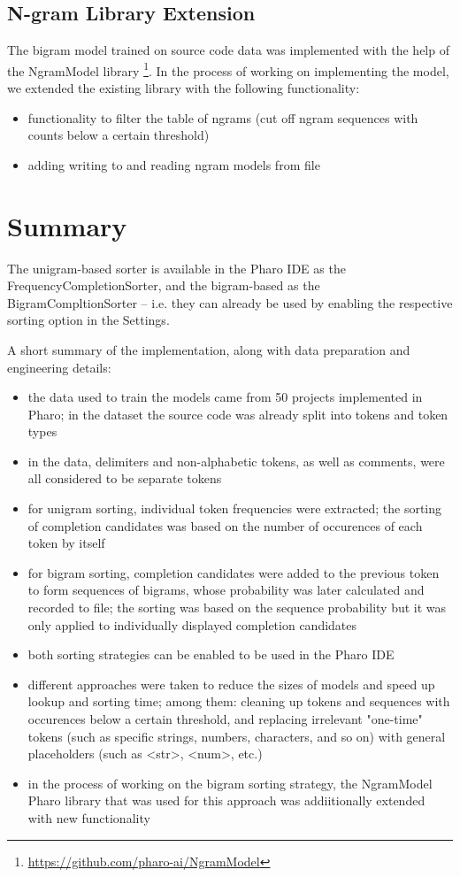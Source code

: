 \subsection{N-gram Library Extension}
The bigram model trained on source code data was implemented with the help of the NgramModel library \footnote{\url{https://github.com/pharo-ai/NgramModel}}. In the process of working on implementing the model, we extended the existing library with the following functionality:
\begin{itemize}
    \item functionality to filter the table of ngrams (cut off ngram sequences with counts below a certain threshold)
    \item adding writing to and reading ngram models from file
\end{itemize}

\section{Summary}
\label{sec:ProposedSolution-Summary}
The unigram-based sorter is available in the Pharo IDE as the FrequencyCompletionSorter, and the bigram-based as the BigramCompltionSorter -- i.e. they can already be used by enabling the respective sorting option in the Settings.

A short summary of the implementation, along with data preparation and engineering details:
\begin{itemize}
    \item the data used to train the models came from 50 projects implemented in Pharo; in the dataset the source code was already split into tokens and token types
    \item in the data, delimiters and non-alphabetic tokens, as well as comments, were all considered to be separate tokens
    \item for unigram sorting, individual token frequencies were extracted; the sorting of completion candidates was based on the number of occurences of each token by itself
    \item for bigram sorting, completion candidates were added to the previous token to form sequences of bigrams, whose probability was later calculated and recorded to file; the sorting was based on the sequence probability but it was only applied to individually displayed completion candidates
    \item both sorting strategies can be enabled to be used in the Pharo IDE
    \item different approaches were taken to reduce the sizes of models and speed up lookup and sorting time; among them: cleaning up tokens and sequences with occurences below a certain threshold, and replacing irrelevant "one-time" tokens (such as specific strings, numbers, characters, and so on) with general placeholders (such as <str>, <num>, etc.)
    \item in the process of working on the bigram sorting strategy, the NgramModel Pharo library that was used for this approach was addiitionally extended with new functionality
\end{itemize}

